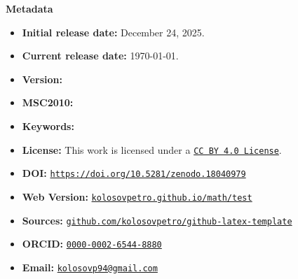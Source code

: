 {\large\textbf{Metadata}}
\begin{itemize}[leftmargin=22pt]
  \item \textbf{Initial release date:} December 24, 2025.
  \item \textbf{Current release date:} \today.
  \item \textbf{Version:} 
  \item \textbf{MSC2010:} 
  \item \textbf{Keywords:} 
  \item \textbf{License:} This work is licensed under a \href{https://creativecommons.org/licenses/by/4.0/}{\texttt{CC BY 4.0 License}}.
  \item \textbf{DOI:} \href{https://doi.org/10.5281/zenodo.18040979}{\texttt{https://doi.org/10.5281/zenodo.18040979}}
  \item \textbf{Web Version:} \href{https://kolosovpetro.github.io/math/test/}{\texttt{kolosovpetro.github.io/math/test}}
  \item \textbf{Sources:} \href{https://github.com/kolosovpetro/github-latex-template}{\texttt{github.com/kolosovpetro/github-latex-template}}
  \item \textbf{ORCID:} \href{https://orcid.org/0000-0002-6544-8880}{\texttt{0000-0002-6544-8880}}
  \item \textbf{Email:} \href{mailto:kolosovp94@gmail.com}{\texttt{kolosovp94@gmail.com}}
\end{itemize}
